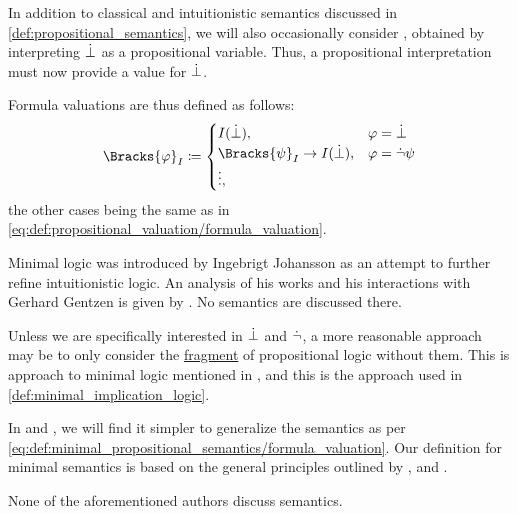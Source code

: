 \begin{definition}\label{def:minimal_propositional_semantics}\mimprovised
  In addition to classical and intuitionistic semantics discussed in \cref{def:propositional_semantics}, we will also occasionally consider , obtained by interpreting \( \dot{\bot} \) as a propositional variable. Thus, a propositional interpretation must now provide a value for \( \dot{\bot} \).

  Formula valuations are thus defined as follows:
  \begin{equation}\label{eq:def:minimal_propositional_semantics/formula_valuation}
    \Bracks{\varphi}_I \coloneqq \begin{cases}
      I(\synbot),                             &\varphi = \synbot \\
      \Bracks{\psi}_I \rightarrow I(\synbot), &\varphi = \synneg \psi \\
      \vdots,                                 &
    \end{cases}
  \end{equation}
  the other cases being the same as in \eqref{eq:def:propositional_valuation/formula_valuation}.
\end{definition}
\begin{comments}
  \item Minimal logic was introduced by Ingebrigt Johansson as an attempt to further refine intuitionistic logic. An analysis of his works and his interactions with Gerhard Gentzen is given by . No semantics are discussed there.

  Unless we are specifically interested in \( \dot{\bot} \) and \( \dot{\neg} \), a more reasonable approach may be to only consider the \hyperref[con:syntax_fragment]{fragment} of propositional logic without them. This is approach to minimal logic mentioned in , and this is the approach used in \cref{def:minimal_implication_logic}.

  In  and , we will find it simpler to generalize the semantics as per \eqref{eq:def:minimal_propositional_semantics/formula_valuation}. Our definition for minimal semantics is based on the general principles outlined by ,  and .

  None of the aforementioned authors discuss semantics.
\end{comments}

